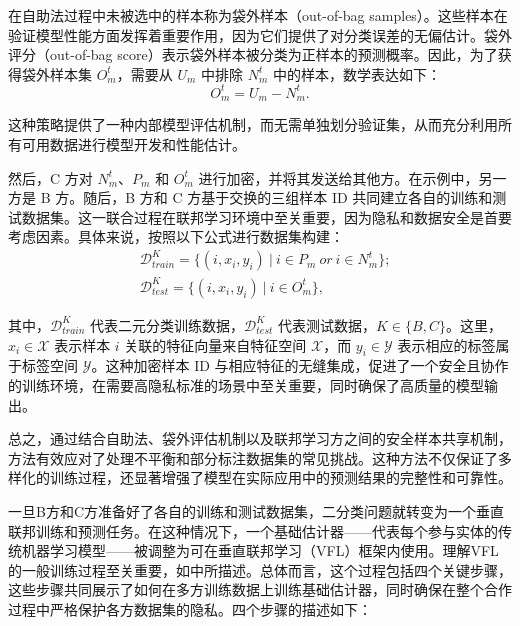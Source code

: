 在自助法过程中未被选中的样本称为袋外样本（out-of-bag samples）。这些样本在验证模型性能方面发挥着重要作用，因为它们提供了对分类误差的无偏估计。袋外评分（out-of-bag score）表示袋外样本被分类为正样本的预测概率。因此，为了获得袋外样本集 $O_{m}^{t}$，需要从 $U_{m}$ 中排除 $N_{m}^{t}$ 中的样本，数学表达如下：
\begin{equation}
	O_{m}^{t}=U_{m}-N_{m}^{t}.
\end{equation}

这种策略提供了一种内部模型评估机制，而无需单独划分验证集，从而充分利用所有可用数据进行模型开发和性能估计。

然后，C 方对 $N_{m}^{t}$、$P_{m}$ 和 $O_{m}^{t}$ 进行加密，并将其发送给其他方。在示例中，另一方是 B 方。随后，B 方和 C 方基于交换的三组样本 ID 共同建立各自的训练和测试数据集。这一联合过程在联邦学习环境中至关重要，因为隐私和数据安全是首要考虑因素。具体来说，按照以下公式进行数据集构建：
\begin{equation}
	\begin{split}
		&\mathsf{\mathcal{D}}_{train}^{K}=\{(i,x_{i},y_{i}) \ | \ i\in P_{m}\ or\ i\in N_{m}^{t}\};\\
		&\mathsf{\mathcal{D}}_{test}^{K}=\{(i,x_{i},y_{i}) \ | \ i\in O_{m}^{t}\},
	\end{split}
\end{equation}

其中，$\mathsf{\mathcal{D}}_{train}^{K}$ 代表二元分类训练数据，$\mathsf{\mathcal{D}}_{test}^{K}$ 代表测试数据，$K\in \{B,C\}$。这里，$x_{i}\in \mathsf{\mathcal{X}}$ 表示样本 $i$ 关联的特征向量来自特征空间 $\mathsf{\mathcal{X}}$，而 $y_{i}\in \mathsf{\mathcal{Y}}$ 表示相应的标签属于标签空间 $\mathsf{\mathcal{Y}}$。这种加密样本 ID 与相应特征的无缝集成，促进了一个安全且协作的训练环境，在需要高隐私标准的场景中至关重要，同时确保了高质量的模型输出。

总之，通过结合自助法、袋外评估机制以及联邦学习方之间的安全样本共享机制，方法有效应对了处理不平衡和部分标注数据集的常见挑战。这种方法不仅保证了多样化的训练过程，还显著增强了模型在实际应用中的预测结果的完整性和可靠性。

一旦B方和C方准备好了各自的训练和测试数据集，二分类问题就转变为一个垂直联邦训练和预测任务。在这种情况下，一个基础估计器——代表每个参与实体的传统机器学习模型——被调整为可在垂直联邦学习（VFL）框架内使用。理解VFL的一般训练过程至关重要，如\citep{yang2019federated}中所描述。总体而言，这个过程包括四个关键步骤，这些步骤共同展示了如何在多方训练数据上训练基础估计器，同时确保在整个合作过程中严格保护各方数据集的隐私。四个步骤的描述如下：

